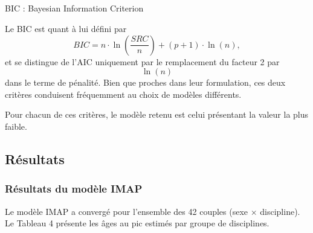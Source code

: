 \documentclass[
  french,
  11pt,
  a4paper,
]{article}
\makeatletter
\let\oldsubparagraph\subparagraph
\renewcommand{\subparagraph}{
    \@ifstar
      \xxxSubParagraphStar
      \xxxSubParagraphNoStar
  }
\newcommand{\xxxSubParagraphStar}[1]{\oldsubparagraph*{#1}\mbox{}}
\newcommand{\xxxSubParagraphNoStar}[1]{\oldsubparagraph{#1}\mbox{}}
\makeatother
\begin{document}
\subparagraph{BIC : Bayesian Information
Criterion}\label{bic-bayesian-information-criterion}

Le BIC est quant à lui défini par
\[BIC=n \cdot \ln(\frac {SRC} n)+(p+1) \cdot \ln (n),\] et se distingue
de l'AIC uniquement par le remplacement du facteur 2 par \[\ln (n)\]
dans le terme de pénalité. Bien que proches dans leur formulation, ces
deux critères conduisent fréquemment au choix de modèles différents.

Pour chacun de ces critères, le modèle retenu est celui présentant la
valeur la plus faible.

\subsection{Résultats}\label{ruxe9sultats-1}

\subsubsection*{Résultats du modèle
IMAP}\label{ruxe9sultats-du-moduxe8le-imap}

Le modèle IMAP a convergé pour l'ensemble des 42 couples (sexe
\(\times\) discipline). Le Tableau 4 présente les âges au pic estimés
par groupe de disciplines.
\end{document}
